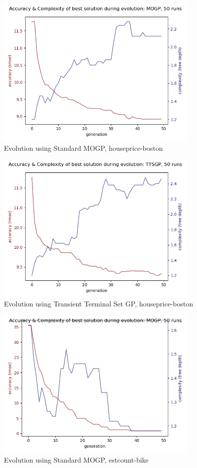 \documentclass[a4paper]{article}
\begin{document}
\begin{figure}[H]
	\caption{Evolution using Standard MOGP, houseprice-boston}
	\centering
	\includegraphics[width=0.875\textwidth]{houseprice-boston-evo-MOGP}
\end{figure}
\begin{figure}[H]
	\caption{Evolution using Transient Terminal Set GP, houseprice-boston}
	\centering
	\includegraphics[width=0.875\textwidth]{houseprice-boston-evo-TTSGP}
\end{figure}
\begin{figure}[H]
	\caption{Evolution using Standard MOGP, estcount-bike}
	\centering
	\includegraphics[width=0.875\textwidth]{estcount-bike-evo-MOGP}
\end{figure}
\end{document}
